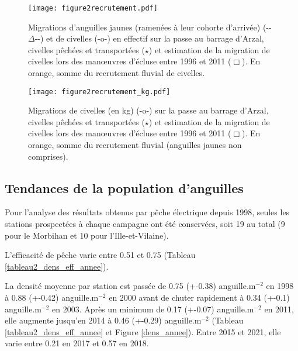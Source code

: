 \documentclass[10pt,twocolumn,titlepage,twoside]{article}\usepackage[]{graphicx}\usepackage[]{xcolor}
\begin{document}
\begin{figure}[htbp]
\centering
\texttt{[image: figure2recrutement.pdf]}
\caption[Tendance des densités modèle]{Migrations d'anguilles
jaunes (ramenées à leur cohorte d'arrivée) (\textmd{{}-{}-${\Delta}$-{}-}) et de civelles
(\textmd{{}-}o\textmd{{}-}) en effectif sur la passe au barrage d'Arzal,
civelles pêchées et transportées ($\star$) et estimation de la migration de civelles
lors des man{\oe}uvres d'écluse entre 1996 et 2011 ($\Box$). En orange, somme du
recrutement fluvial de civelles.}
\label{figure2recrutement}
\end{figure}

\begin{figure}[htbp]
\centering
\texttt{[image: figure2recrutement\_kg.pdf]}
\caption[Tendance des densités modèle]{Migrations de civelles (en kg)
(\textmd{{}-}o\textmd{{}-}) sur la passe au barrage d'Arzal, civelles pêchées
et transportées ($\star$) et estimation de la migration de civelles
lors des man{\oe}uvres d'écluse entre 1996 et 2011 ($\Box$). En orange, somme du
recrutement fluvial (anguilles jaunes non comprises).}
\label{figure2recrutement_kg}
\end{figure}

\subsection{Tendances de la population d'anguilles}



%
%

%

%

%

%


%




Pour l'analyse des résultats obtenus par pêche
électrique depuis 1998, seules les stations prospectées à chaque
campagne ont été conservées, soit 19 au total (9 pour le Morbihan
et 10 pour l'Ille-et-Vilaine).
\small

\normalsize
L'efficacité de pêche varie entre 0.51 et
0.75 (Tableau \ref{tableau2_dens_eff_annee}). 

La densité moyenne par station est
passée de 0.75 (+-0.38) anguille.m$^{-2}$ en 1998 
à 0.88 (+-0.42) anguille.m$^{-2}$ en 2000 
avant de chuter rapidement à 0.34 (+-0.1) anguille.m$^{-2}$ en 2003. 
Après un minimum de 0.17
(+-0.07) anguille.m$^{-2}$ en 2011, elle augmente
jusqu'en 2014 à 0.46
(+-0.29) anguille.m$^{-2}$
(Tableau \ref{tableau2_dens_eff_annee} et Figure \ref{dens_annee}).
Entre 2015 et 2021, elle varie entre 0.21 en
2017 et 0.57 en 2018.
\end{document}
